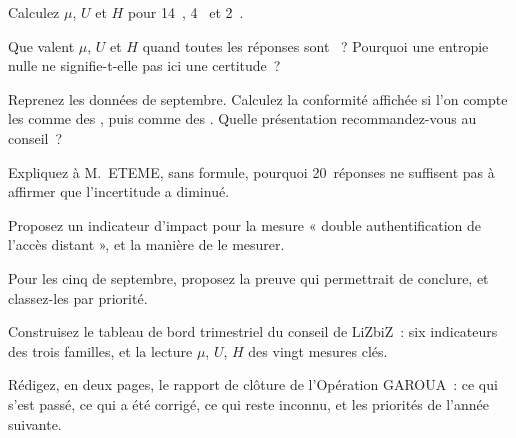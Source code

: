 \begin{boxexo}[title={\ding{45}\quad Exercice~26.3. Calculer \niveaubase}]
Calculez \(\mu\), \(U\) et \(H\) pour 14~\OUI{}, 4~\NON{} et 2~\NEK{}.
\end{boxexo}

\begin{boxexo}[title={\ding{45}\quad Exercice~26.4. Les cas limites \niveaumoyen}]
Que valent \(\mu\), \(U\) et \(H\) quand toutes les réponses sont \NEK{}~?
Pourquoi une entropie nulle ne signifie-t-elle pas ici une certitude~?
\end{boxexo}

\begin{boxexo}[title={\ding{45}\quad Exercice~26.5. Compter les NEK \niveaumoyen}]
Reprenez les données de septembre. Calculez la conformité affichée si
l'on compte les \NEK{} comme des \OUI{}, puis comme des \NON{}. Quelle
présentation recommandez-vous au conseil~?
\end{boxexo}

\begin{boxexo}[title={\ding{45}\quad Exercice~26.6. La marge \niveaumoyen}]
Expliquez à M.~ETEME, sans formule, pourquoi 20~réponses ne suffisent pas
à affirmer que l'incertitude a diminué.
\end{boxexo}

\begin{boxexo}[title={\ding{45}\quad Exercice~26.7. Un indicateur d'impact \niveaumoyen}]
Proposez un indicateur d'impact pour la mesure « double authentification
de l'accès distant », et la manière de le mesurer.
\end{boxexo}

\begin{boxexo}[title={\ding{45}\quad Exercice~26.8. Réduire U \niveaumoyen}]
Pour les cinq \NEK{} de septembre, proposez la preuve qui permettrait de
conclure, et classez-les par priorité.
\end{boxexo}

\begin{boxexo}[title={\ding{45}\quad Exercice~26.9. Le tableau de bord \niveauexpert}]
Construisez le tableau de bord trimestriel du conseil de LiZbiZ~: six
indicateurs des trois familles, et la lecture \(\mu\), \(U\), \(H\) des
vingt mesures clés.
\end{boxexo}

\begin{boxexo}[title={\ding{45}\quad Exercice~26.10. Synthèse \niveauexpert}]
Rédigez, en deux pages, le rapport de clôture de l'Opération GAROUA~: ce
qui s'est passé, ce qui a été corrigé, ce qui reste inconnu, et les
priorités de l'année suivante.
\end{boxexo}

